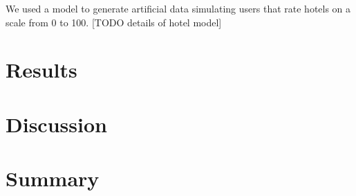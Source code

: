 \documentclass[10pt,conference,compsocconf]{IEEEtran}
\begin{document}
We used a model to generate artificial data simulating users that rate hotels on a scale from 0 to 100. [TODO details of hotel model]






\section{Results}


\section{Discussion}



\section{Summary}




\end{document}
